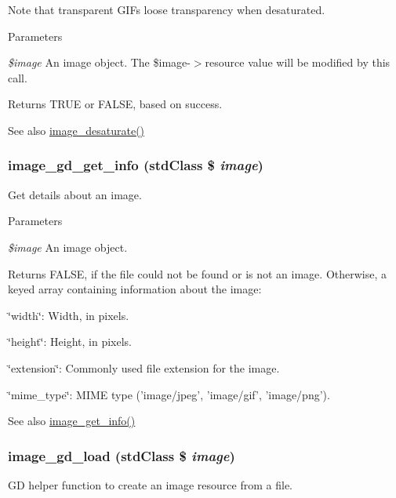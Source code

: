 Note that transparent GIFs loose transparency when desaturated.


\begin{DoxyParams}{Parameters}
\item[{\em \$image}]An image object. The \$image-\/$>$resource value will be modified by this call. \end{DoxyParams}
\begin{DoxyReturn}{Returns}
TRUE or FALSE, based on success.
\end{DoxyReturn}
\begin{DoxySeeAlso}{See also}
\hyperlink{group__image_gadfcfdfcf1521b26ec790fc017c151aff}{image\_\-desaturate()} 
\end{DoxySeeAlso}
\hypertarget{group__image_gae5b31eb967a96b6b109dd5ddf720ab42}{
\subsubsection[{image\_\-gd\_\-get\_\-info}]{\setlength{\rightskip}{0pt plus 5cm}image\_\-gd\_\-get\_\-info (stdClass \$ {\em image})}}
\label{group__image_gae5b31eb967a96b6b109dd5ddf720ab42}
Get details about an image.


\begin{DoxyParams}{Parameters}
\item[{\em \$image}]An image object. \end{DoxyParams}
\begin{DoxyReturn}{Returns}
FALSE, if the file could not be found or is not an image. Otherwise, a keyed array containing information about the image:
\begin{DoxyItemize}
\item \char`\"{}width\char`\"{}: Width, in pixels.
\item \char`\"{}height\char`\"{}: Height, in pixels.
\item \char`\"{}extension\char`\"{}: Commonly used file extension for the image.
\item \char`\"{}mime\_\-type\char`\"{}: MIME type ('image/jpeg', 'image/gif', 'image/png').
\end{DoxyItemize}
\end{DoxyReturn}
\begin{DoxySeeAlso}{See also}
\hyperlink{group__image_ga7b2603b2b9d073cc4db9a6200aa9c2a4}{image\_\-get\_\-info()} 
\end{DoxySeeAlso}
\hypertarget{group__image_gaa3b2912916ff9cfec8c7c8df8f3f1d75}{
\subsubsection[{image\_\-gd\_\-load}]{\setlength{\rightskip}{0pt plus 5cm}image\_\-gd\_\-load (stdClass \$ {\em image})}}
\label{group__image_gaa3b2912916ff9cfec8c7c8df8f3f1d75}
GD helper function to create an image resource from a file.


